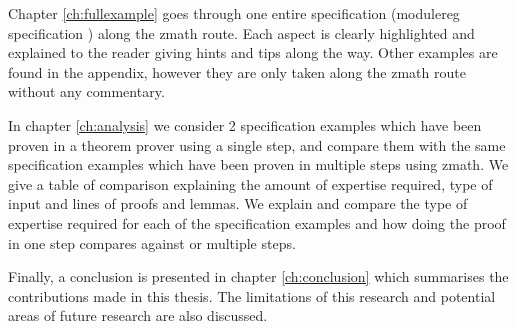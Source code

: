 Chapter \ref{ch:fullexample} goes through one entire specification (modulereg specification \cite{essenceofz}) along the \gls{zmath} route. Each aspect is clearly highlighted and explained to the reader giving hints and tips along the way. Other examples are found in the appendix, however they are only taken along the \gls{zmath} route without any commentary.

In chapter \ref{ch:analysis} we consider 2 specification examples which have been proven in a theorem prover using a single step, and compare them with the same specification examples which have been proven in multiple steps using \gls{zmath}. We give a table of comparison explaining the amount of expertise required, type of input and lines of proofs and lemmas. We explain and compare the type of expertise required for each of the specification examples and how doing the proof in one step compares against or multiple steps.

Finally, a conclusion is presented in chapter \ref{ch:conclusion} which summarises the contributions made in this thesis. The limitations of this research and potential areas of future research are also discussed.
